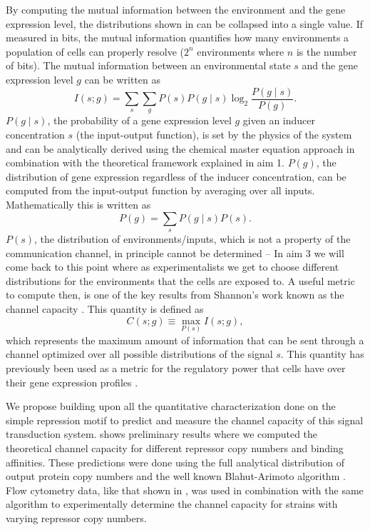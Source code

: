 By computing the mutual information between the environment and the gene
expression level, the distributions shown in  can be
collapsed into a single value. If measured in bits, the mutual information
quantifies how many environments a population of cells can properly resolve
($2^{n}$ environments where $n$ is the number of bits). The mutual information
between an environmental state $s$ and the gene expression level $g$ can be
written as
\begin{equation}
  I(s;g) = \sum_s \sum_g P(s) P(g \mid s) \log_2 \frac{P(g \mid s)}{P(g)}.
\end{equation}
$P(g \mid s)$, the probability of a gene expression level $g$
given an inducer concentration $s$ (the input-output function), is set by the
physics of the system and can be analytically derived using the chemical master
equation approach \cite{Shahrezaei2008, Swain2016} in combination with the
theoretical framework explained in aim 1. $P(g)$, the distribution of gene
expression regardless of the inducer concentration, can be computed from the
input-output function by averaging over all inputs. Mathematically this is
written as
\begin{equation}
  P(g) = \sum_s P(g \mid s) P(s).
\end{equation}
$P(s)$, the distribution of environments/inputs, which is not a property of the
communication channel, in principle cannot be determined -- In aim 3 we will
come back to this point where as experimentalists we get to choose different
distributions for the environments that the cells are exposed to. A useful
metric to compute then, is one of the key results from Shannon's work known as
the channel capacity \cite{Rhee2012a}. This quantity is defined as
\begin{equation}
  C(s; g) \equiv \max_{P(s)} I(s; g),
\end{equation}
which represents the maximum amount of information that can be sent through a
channel optimized over all possible distributions of the signal $s$.
This quantity has previously been used as a metric for the regulatory power that
cells have over their gene expression profiles \cite{Tkacik2008a, Rieckh2014}.

We propose building upon all the quantitative characterization done on the
simple repression motif to predict and measure the channel capacity of this
signal transduction system.  shows preliminary results where
we computed the theoretical channel capacity for different repressor copy
numbers and binding affinities. These predictions were done using the full
analytical distribution of output protein copy numbers \cite{Shahrezaei2008} and
the well known Blahut-Arimoto algorithm \cite{Blahut1972}. Flow cytometry data,
like that shown in , was used in combination with the same
algorithm to experimentally determine the channel capacity for strains with
varying repressor copy numbers.

